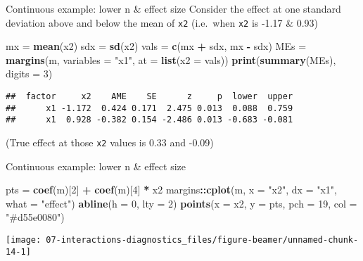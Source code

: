 \documentclass[
  ignorenonframetext,
]{beamer}
\newenvironment{Shaded}{\begin{snugshade}}{\end{snugshade}}
\newcommand{\AttributeTok}[1]{\textcolor[rgb]{0.13,0.29,0.53}{#1}}
\newcommand{\DecValTok}[1]{\textcolor[rgb]{0.00,0.00,0.81}{#1}}
\newcommand{\FunctionTok}[1]{\textcolor[rgb]{0.13,0.29,0.53}{\textbf{#1}}}
\newcommand{\NormalTok}[1]{#1}
\newcommand{\OtherTok}[1]{\textcolor[rgb]{0.56,0.35,0.01}{#1}}
\newcommand{\SpecialCharTok}[1]{\textcolor[rgb]{0.81,0.36,0.00}{\textbf{#1}}}
\newcommand{\StringTok}[1]{\textcolor[rgb]{0.31,0.60,0.02}{#1}}
\begin{document}
\begin{frame}[fragile]{Continuous example: lower n \& effect size}
\protect\hypertarget{continuous-example-lower-n-effect-size-2}{}
Consider the effect at one standard deviation above and below the mean of \texttt{x2}
(i.e.~when \texttt{x2} is -1.17 \& 0.93)

\pause

\begin{Shaded}
\begin{Highlighting}[]
\NormalTok{mx   }\OtherTok{=} \FunctionTok{mean}\NormalTok{(x2)}
\NormalTok{sdx  }\OtherTok{=} \FunctionTok{sd}\NormalTok{(x2)}
\NormalTok{vals }\OtherTok{=} \FunctionTok{c}\NormalTok{(mx }\SpecialCharTok{+}\NormalTok{ sdx, mx }\SpecialCharTok{{-}}\NormalTok{ sdx)}
\NormalTok{MEs  }\OtherTok{=} \FunctionTok{margins}\NormalTok{(m, }\AttributeTok{variables =} \StringTok{"x1"}\NormalTok{, }\AttributeTok{at =} \FunctionTok{list}\NormalTok{(}\AttributeTok{x2 =}\NormalTok{ vals))}
\FunctionTok{print}\NormalTok{(}\FunctionTok{summary}\NormalTok{(MEs), }\AttributeTok{digits =} \DecValTok{3}\NormalTok{)}
\end{Highlighting}
\end{Shaded}

\begin{verbatim}
##  factor     x2    AME    SE      z     p  lower  upper
##      x1 -1.172  0.424 0.171  2.475 0.013  0.088  0.759
##      x1  0.928 -0.382 0.154 -2.486 0.013 -0.683 -0.081
\end{verbatim}

(True effect at those \texttt{x2} values is 0.33 and -0.09)
\end{frame}

\begin{frame}[fragile]{Continuous example: lower n \& effect size}
\protect\hypertarget{continuous-example-lower-n-effect-size-3}{}
\begin{Shaded}
\begin{Highlighting}[]
\NormalTok{pts }\OtherTok{=} \FunctionTok{coef}\NormalTok{(m)[}\DecValTok{2}\NormalTok{] }\SpecialCharTok{+} \FunctionTok{coef}\NormalTok{(m)[}\DecValTok{4}\NormalTok{] }\SpecialCharTok{*}\NormalTok{ x2}
\NormalTok{margins}\SpecialCharTok{::}\FunctionTok{cplot}\NormalTok{(m, }\AttributeTok{x =} \StringTok{"x2"}\NormalTok{, }\AttributeTok{dx =} \StringTok{"x1"}\NormalTok{, }\AttributeTok{what =} \StringTok{"effect"}\NormalTok{)}
\FunctionTok{abline}\NormalTok{(}\AttributeTok{h =} \DecValTok{0}\NormalTok{, }\AttributeTok{lty =} \DecValTok{2}\NormalTok{)}
\FunctionTok{points}\NormalTok{(}\AttributeTok{x =}\NormalTok{ x2, }\AttributeTok{y =}\NormalTok{ pts, }\AttributeTok{pch =} \DecValTok{19}\NormalTok{, }\AttributeTok{col =} \StringTok{"\#d55e0080"}\NormalTok{)}
\end{Highlighting}
\end{Shaded}

\texttt{[image: 07-interactions-diagnostics\_files/figure-beamer/unnamed-chunk-14-1]}
\end{frame}
\end{document}
